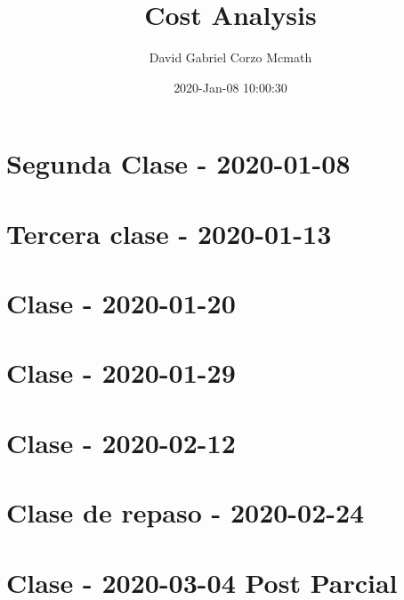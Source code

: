 \documentclass{book}
\title{Cost Analysis}
\author{David Gabriel Corzo Mcmath}
\date{2020-Jan-08 10:00:30}
\begin{document}
\maketitle
\tableofcontents

\chapter{Segunda Clase - 2020-01-08}


\chapter{Tercera clase - 2020-01-13}


\chapter{Clase - 2020-01-20}


\chapter{Clase - 2020-01-29}


\chapter{Clase - 2020-02-12}


\chapter{Clase de repaso - 2020-02-24}


\chapter{Clase - 2020-03-04 Post Parcial}

\end{document}
